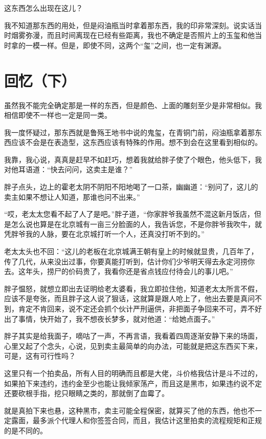 这东西怎么出现在这儿？

我不知道那东西的用处，但是闷油瓶当时拿着那东西，我的印非常深刻。说实话当时烟雾弥漫，而且时间离现在已经有些距离，我也不确定是否照片上的玉玺和他当时拿的一模一样。但是，即使不同，这两个“玺”之间，也一定有渊源。

\chapter{回忆（下）}

虽然我不能完全确定那是一样的东西，但是颜色、上面的雕刻至少是非常相似。我相信即使不一样也一定是同一类。

我一度怀疑过，那东西就是鲁殇王地书中说的鬼玺，在青铜门前，闷油瓶拿着那东西应该不会是在表造型，这东西应该有特殊的作用。想不到会在这里看到相似的。

我靠，我心说，真真是赶早不如赶巧，想着我就给胖子使了个眼色，他头低下，我对他耳语道：“快去问问，这卖主是谁？”

胖子点头，边上的霍老太阴不阴阳不阳地喝了一口茶，幽幽道：“别问了，这儿的卖主如果不想让人知道，那谁也问不出来。”

“哎，老太太您看不起了人了是吧。”胖子道，“你家胖爷我虽然不混这新月饭店，但是怎么说也算是在北京城有一亩三分脸面的人，我告诉您，不是你胖爷我吹牛，就凭胖爷我的人脉，要在北京城打听一个人，还真没打听不到的。”

老太太头也不回：“这儿的老板在北京城满王朝有皇上的时候就显贵，几百年了，传了几代，从来没出过事，你要真能打听到，估计你们少爷明天得去永定河捞你去。这年头，捞尸的价码贵了，我看你还是省点钱应付待会儿的事儿吧。”

胖子愠怒，就想立即出去证明给老太婆看，我立即拉住他，知道老太太所言不假，应该不是夸张，而且胖子这人说了狠话，这就算是跟人呛上了，他出去要是真问不到，肯定不肯回来，说不定还会抓个伙计严刑逼供，非把面子争回来不可，弄不好出了事情，快开始了，我不想夜长梦多，就对他道：“给她点面子。”

胖子其实是给我面子，嘀咕了一声，不再言语，我看着四周逐渐安静下来的场面，心里又起了个念头，心说，见到卖主最简单的向办法，可能就是把这东西买下来，可是，这有可行性吗？

这里只有一个拍卖品，所有人目的明确而且都是大佬，斗价格我估计是斗不过的，如果拍下来违约，违约金至少也能让我倾家荡产，而且这是黑市，如果违约说不定还要砍根手指，挖只眼睛之类的，那就倒了血霉了。

就是真拍下来也悬，这种黑市，卖主可能全程保密，就算买了他的东西，他也不一定露面，最多派个代理人和你签签合同，而且，我估计这里拍卖的流程规矩和正规的是不同的。


